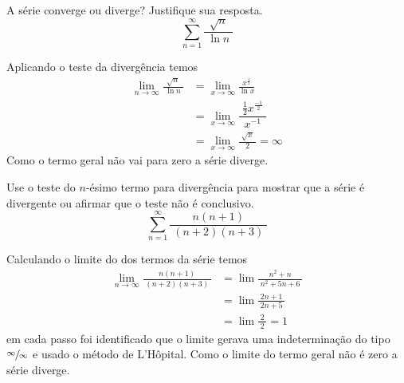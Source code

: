 \begin{exercises}

\begin{exercise}
A série converge ou diverge? Justifique sua resposta.
\[
  \sum_{n=1}^{\infty} \frac{\sqrt{n}}{\;\ln n\;}
\]
\begin{answer}
  Aplicando o teste da divergência temos
  \begin{align*}
  	\lim_{n\to\infty} \frac{\sqrt{n}}{\;\ln n\;} & = \lim_{x\to\infty} \frac{\; x^{\frac{1}{2}} \;}{ \ln x }                \\[2mm]
  	                                             & = \lim_{x\to\infty} \dfrac{\; \frac{1}{2} x^{\frac{-1}{2}} \;}{ x^{-1} } \\[2mm]
  	                                             & = \lim_{x\to\infty} \frac{\; \sqrt{x} \;}{ 2 } = \infty
  \end{align*}
  Como o termo geral não vai para zero a série diverge.
\end{answer}
\end{exercise}

\begin{exercise}
  Use o teste do $n$-ésimo termo para divergência para mostrar que a série é divergente
  ou afirmar que o teste não é conclusivo.
  \[
  \sum_{n=1}^{\infty} \frac{n(n+1)}{\;(n+2)(n+3)\;}
  \]
  \begin{answer}
    Calculando o limite do dos termos da série temos
    \begin{align*}
    \lim_{n\to\infty} \frac{n(n+1)}{\;(n+2)(n+3)\;} & = \lim \frac{n^2+n}{\;n^2 +5n +6\;} \\
    & = \lim \frac{2n+1}{\;2n +5\;}       \\
    & = \lim \frac{2}{\;2\;} = 1
    \end{align*}
    em cada passo foi identificado que o limite gerava uma
    indeterminação do tipo $\sfrac{\infty}{\infty}$
    e usado o método de L'Hôpital.
    Como o limite do termo geral não é zero a série diverge.
  \end{answer}
\end{exercise}


\end{exercises}

